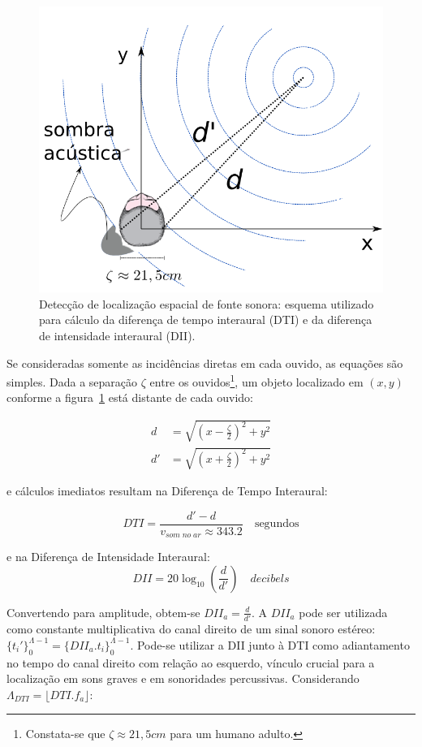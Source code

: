 \begin{figure}[h!]
    \centering
        \includegraphics[width=.5\textwidth]{figuras/espacializacao___}
    \caption{Detecção de localização espacial de fonte sonora: esquema utilizado para cálculo da diferença de tempo interaural (DTI) e da diferença de intensidade interaural (DII).}
        \label{fig:spac}
\end{figure}



	Se consideradas somente as incidências diretas em cada ouvido, as equações são simples. Dada a separação $\zeta$ entre os ouvidos\footnote{Constata-se que $\zeta \approx 21,5cm$ para um humano adulto.},
um objeto localizado em $(x,y)$ conforme a figura~\ref{fig:spac}
está distante de cada ouvido:

\begin{equation}\label{eq:distOuvidos}
\begin{split}
d & =\sqrt{\left (x-\frac{\zeta}{2} \right )^2+y^2} \\
d' & =\sqrt{\left (x+\frac{\zeta}{2} \right )^2 + y^2}
\end{split}
\end{equation}


e cálculos imediatos resultam na Diferença de Tempo Interaural:

\begin{equation}\label{eq:dti}
DTI=\frac{d'-d}{v_{som\;no\;ar}\approx 343.2 }\quad \text{segundos}
\end{equation}

e na Diferença de Intensidade Interaural:
\begin{equation}\label{eq:dii}
DII=20\log_{10}\left (\frac{d}{d'}\right) \quad decibels
\end{equation}

Convertendo para amplitude, obtem-se $DII_a=\frac{d}{d'}$. A $DII_a$ pode
ser utilizada como constante multiplicativa do canal direito de um sinal sonoro estéreo: $\{t_i'\}_0^{\Lambda -1}=\{DII_a . t_i\}_0^{\Lambda -1}$. Pode-se utilizar a DII junto à DTI como adiantamento no tempo do canal direito com relação ao esquerdo, vínculo crucial para a localização em sons graves e em sonoridades percussivas.\cite{Heeger}  
Considerando $\Lambda_{DTI}=\lfloor DTI . f_a \rfloor$:

